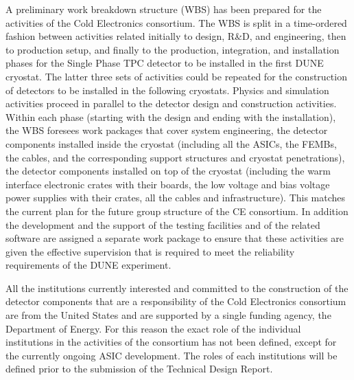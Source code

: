 A preliminary work breakdown structure (WBS) has been prepared for the activities
of the Cold Electronics consortium. The WBS is split in a time-ordered fashion
between activities related initially to design, R\&D, and engineering, then
to production setup, and finally to the production, integration, and installation
phases for the Single Phase TPC detector to be installed in the first DUNE cryostat.
The latter three sets of activities could be repeated for the construction
of detectors to be installed in the following cryostats. Physics and simulation
activities proceed in parallel to the detector design and construction activities.
Within each phase (starting with the design and ending with the installation),
the WBS foresees work packages that cover system engineering, the detector
components installed inside the cryostat (including all the ASICs, the FEMBs,
the cables, and the corresponding support structures and cryostat penetrations),
the detector components installed on top of the cryostat (including the warm
interface electronic crates with their boards, the low voltage and bias
voltage power supplies with their crates, all the cables and infrastructure). This
matches the current plan for the future group structure of the CE consortium. In
addition the development and the support of the testing facilities and of
the related software are assigned a separate work package to ensure that these activities
are given the effective supervision that is required to meet the reliability
requirements of the DUNE experiment.

All the institutions currently interested and committed to the construction of
the detector components that are a responsibility of the Cold Electronics
consortium are from the United States and are supported by a single
funding agency, the Department of Energy. For this reason the exact role of
the individual institutions in the activities of the consortium has not been
defined, except for the currently ongoing ASIC development. The roles of
each institutions will be defined prior to the submission of the Technical
Design Report.
